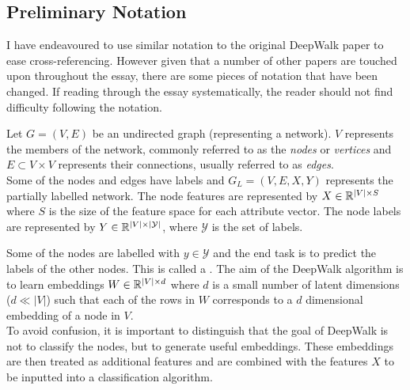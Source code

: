 \documentclass[a4paper]{article}
\begin{document}
\subsection{Preliminary Notation}
I have endeavoured to use similar notation to the original DeepWalk paper\cite{deepwalk} to ease
cross-referencing. However given that a number of other papers are touched upon
throughout the essay, there are some pieces of notation that have been changed.
If reading through the essay systematically, the reader should not find
difficulty following the notation.

\begin{definition}
  Let $G = (V, E)$ be an undirected graph (representing a network). $V$ represents the
  members of the network, commonly referred to as the \textit{nodes} or \textit{vertices} and $E \subset V
  \times V$ represents their connections, usually referred to as
  \textit{edges}.\\
  Some of the nodes and edges have labels and $G_L = (V, E, X, Y)$ represents the
  partially labelled network. The node features are represented by $X \in \R^{|V| \times S}$ where $S$ is the size of
  the feature space for each attribute vector. The node labels are represented by $Y \in \R^{|V|
    \times|\mathcal{Y}|}$, where $\mathcal{Y}$ is the set of labels.
\end{definition}
Some of the nodes are labelled with $y \in \mathcal{Y}$ and the end task is to
predict the labels of the other nodes. This is called a . The aim of the DeepWalk algorithm is to learn embeddings $W \in \R^{|V| \times d}$ where $d$ is a small number
of latent dimensions ($d \ll |V|$) such that each of the rows in $W$
corresponds to a $d$ dimensional embedding of a node in $V$.\\
To avoid confusion, it is important to distinguish that the goal of DeepWalk is
not to classify the nodes, but to generate useful embeddings. These embeddings
are then treated as additional features and are combined with the features $X$
to be inputted into a classification algorithm.
\end{document}
